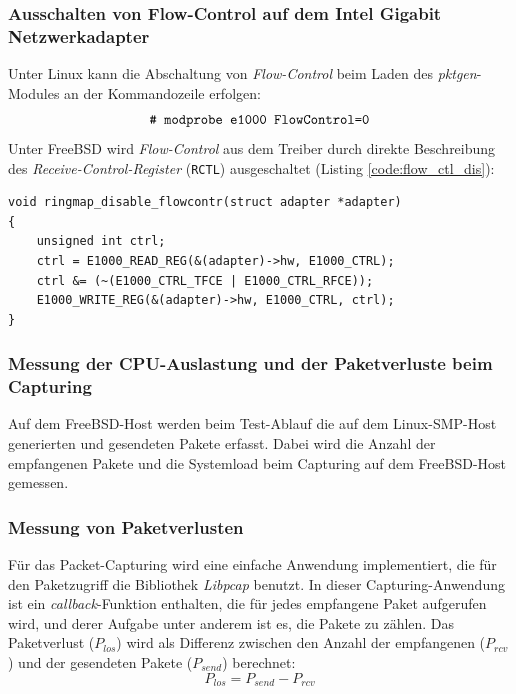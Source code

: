 \subsubsection*{Ausschalten von Flow-Control auf dem Intel Gigabit Netzwerkadapter}
Unter Linux kann die Abschaltung von \emph{Flow-Control} beim Laden des
\emph{pktgen}-Modules an der Kommandozeile erfolgen: 
\begin{equation}
	\verb+# modprobe e1000 FlowControl=0+
\end{equation}
Unter FreeBSD wird \emph{Flow-Control} aus dem Treiber durch direkte Beschreibung 
des \emph{Receive-Control-Register} (\verb+RCTL+) ausgeschaltet (Listing \ref{code:flow_ctl_dis}):
\begin{lstlisting}[frame=single, caption={Funktion zur Ausschaltung des Flow-Control-Mechanismus. Die Funktion wird im ringmap-Treiber verwendet.}, captionpos={b}, label={code:flow_ctl_dis}]
void ringmap_disable_flowcontr(struct adapter *adapter)
{
	unsigned int ctrl; 
	ctrl = E1000_READ_REG(&(adapter)->hw, E1000_CTRL);
	ctrl &= (~(E1000_CTRL_TFCE | E1000_CTRL_RFCE));
	E1000_WRITE_REG(&(adapter)->hw, E1000_CTRL, ctrl);
}
\end{lstlisting}	
%
\subsubsection{Messung der CPU-Auslastung und der Paketverluste beim Capturing}
Auf dem FreeBSD-Host werden beim Test-Ablauf die auf dem Linux-SMP-Host
generierten und gesendeten Pakete erfasst. Dabei wird die Anzahl der
empfangenen Pakete und die Systemload beim Capturing auf dem FreeBSD-Host
gemessen.
%
\subsubsection*{Messung von Paketverlusten}
Für das Packet-Capturing wird eine einfache Anwendung implementiert, die für den
Paketzugriff die Bibliothek \emph{Libpcap} benutzt. In dieser Capturing-Anwendung ist
ein \emph{callback}-Funktion enthalten, die für jedes empfangene Paket
aufgerufen wird, und derer Aufgabe unter anderem ist es, die Pakete zu zählen.
Das Paketverlust (\begin{math}P_{los}\end{math}) wird als Differenz zwischen 
den Anzahl der empfangenen (\begin{math}P_{rcv}\end{math}) und
der gesendeten Pakete (\begin{math}P_{send}\end{math}) berechnet:
	\begin{equation}
		P_{los} = P_{send} - P_{rcv}
		\label{equ:pktloss}
	\end{equation}
%
